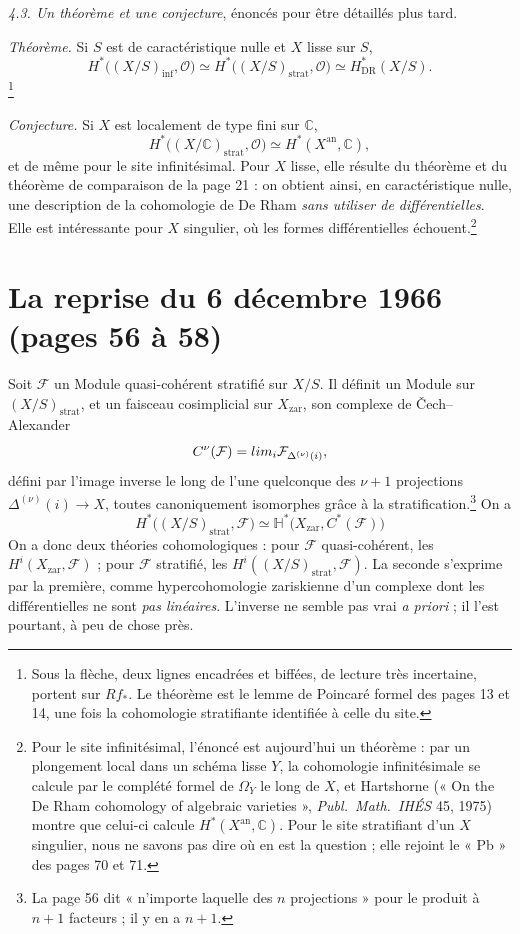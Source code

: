 \documentclass[11pt,a4paper]{article}
\begin{document}
\emph{4.3. Un théorème et une conjecture}, énoncés pour être détaillés plus
tard.

\emph{Théorème.} Si $S$ est de caractéristique nulle et $X$ lisse sur $S$,
\[
  H^{*}\bigl((X/S)_{\mathrm{inf}}, \mathcal{O}\bigr) \simeq
  H^{*}\bigl((X/S)_{\mathrm{strat}}, \mathcal{O}\bigr) \simeq
  H^{*}_{\mathrm{DR}}(X/S) .
\]
\footnote{Sous la flèche, deux lignes encadrées et biffées, de lecture très
incertaine, portent sur $Rf_{*}$. Le théorème est le lemme de Poincaré
formel des pages 13 et 14, une fois la cohomologie stratifiante identifiée à
celle du site.}

\emph{Conjecture.} Si $X$ est localement de type fini sur $\mathbb{C}$,
\[
  H^{*}\bigl((X/\mathbb{C})_{\mathrm{strat}}, \mathcal{O}\bigr)
  \simeq H^{*}(X^{\mathrm{an}}, \mathbb{C}) ,
\]
et de même pour le site infinitésimal. Pour $X$ lisse, elle résulte du
théorème et du théorème de comparaison de la page 21 : on obtient ainsi, en
caractéristique nulle, une description de la cohomologie de De Rham
\emph{sans utiliser de différentielles}. Elle est intéressante pour $X$
singulier, où les formes différentielles échouent.\footnote{Pour le site
infinitésimal, l'énoncé est aujourd'hui un théorème : par un plongement
local dans un schéma lisse $Y$, la cohomologie infinitésimale se calcule par
le complété formel de $\Omega^{\cdot}_Y$ le long de $X$, et Hartshorne
(« On the De Rham cohomology of algebraic varieties », \emph{Publ.\ Math.\
IHÉS} 45, 1975) montre que celui-ci calcule $H^{*}(X^{\mathrm{an}},
\mathbb{C})$. Pour le site stratifiant d'un $X$ singulier, nous ne savons pas
dire où en est la question ; elle rejoint le « Pb » des pages 70 et 71.}

\section*{La reprise du 6 décembre 1966 (pages 56 à 58)}

Soit $\mathcal{F}$ un Module quasi-cohérent stratifié sur $X/S$. Il définit un
Module sur $(X/S)_{\mathrm{strat}}$, et un faisceau cosimplicial sur
$X_{\mathrm{zar}}$, son complexe de Čech--Alexander
\[
  C^{\nu}(\mathcal{F}) = \varprojlim_{i} \mathcal{F}_{\Delta^{(\nu)}(i)} ,
\]
défini par l'image inverse le long de l'une quelconque des $\nu+1$
projections $\Delta^{(\nu)}(i) \to X$, toutes canoniquement isomorphes grâce
à la stratification.\footnote{La page 56 dit « n'importe laquelle des $n$
projections » pour le produit à $n+1$ facteurs ; il y en a $n+1$.} On a
\[
  \boxed{\;H^{*}\bigl((X/S)_{\mathrm{strat}}, \mathcal{F}\bigr) \simeq
  \mathbb{H}^{*}\bigl(X_{\mathrm{zar}}, C^{*}(\mathcal{F})\bigr)\;}
\]
On a donc deux théories cohomologiques : pour $\mathcal{F}$ quasi-cohérent,
les $H^{i}(X_{\mathrm{zar}}, \mathcal{F})$ ; pour $\mathcal{F}$ stratifié,
les $H^{i}((X/S)_{\mathrm{strat}}, \mathcal{F})$. La seconde s'exprime par la
première, comme hypercohomologie zariskienne d'un complexe dont les
différentielles ne sont \emph{pas linéaires}. L'inverse ne semble pas vrai
\emph{a priori} ; il l'est pourtant, à peu de chose près.
\end{document}
